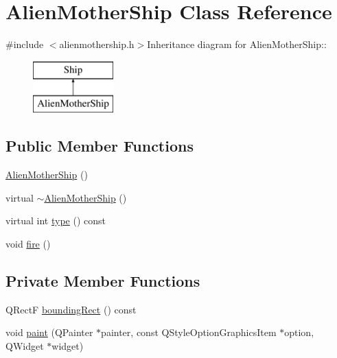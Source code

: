 \hypertarget{class_alien_mother_ship}{
\section{AlienMotherShip Class Reference}
\label{class_alien_mother_ship}
}


{\ttfamily \#include $<$alienmothership.h$>$}Inheritance diagram for AlienMotherShip::\begin{figure}[H]
\begin{center}
\leavevmode
\includegraphics[height=2cm]{class_alien_mother_ship}
\end{center}
\end{figure}
\subsection*{Public Member Functions}
\begin{DoxyCompactItemize}
\item 
\hyperlink{class_alien_mother_ship_a981230852a6b57a58767302cc06dfc66}{AlienMotherShip} ()
\item 
virtual \hyperlink{class_alien_mother_ship_aadc7f7009cd3243f28589e35157ab5fc}{$\sim$AlienMotherShip} ()
\item 
virtual int \hyperlink{class_alien_mother_ship_a9146bdc7fbad43aa8b7dd8c6b94775ff}{type} () const 
\item 
void \hyperlink{class_alien_mother_ship_ae95a8f7d76ccb8ed76f6ce1851c76b5a}{fire} ()
\end{DoxyCompactItemize}
\subsection*{Private Member Functions}
\begin{DoxyCompactItemize}
\item 
QRectF \hyperlink{class_alien_mother_ship_a19b3012b5de609d1b3aeb853bc45489f}{boundingRect} () const 
\item 
void \hyperlink{class_alien_mother_ship_a9d504befceb130b6c833550f6f6a0b53}{paint} (QPainter $\ast$painter, const QStyleOptionGraphicsItem $\ast$option, QWidget $\ast$widget)
\end{DoxyCompactItemize}
